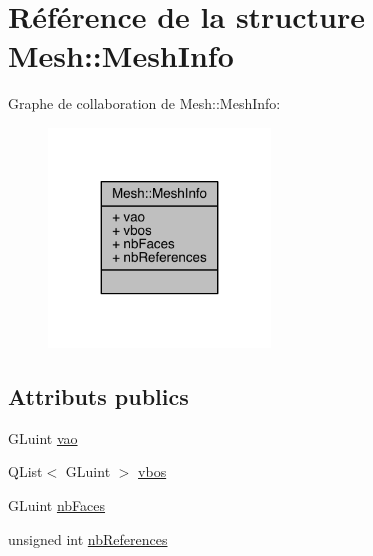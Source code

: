 \hypertarget{struct_mesh_1_1_mesh_info}{\section{Référence de la structure Mesh\+:\+:Mesh\+Info}
\label{struct_mesh_1_1_mesh_info}
}


Graphe de collaboration de Mesh\+:\+:Mesh\+Info\+:
\nopagebreak
\begin{figure}[H]
\begin{center}
\leavevmode
\includegraphics[width=167pt]{struct_mesh_1_1_mesh_info__coll__graph}
\end{center}
\end{figure}
\subsection*{Attributs publics}
\begin{DoxyCompactItemize}
\item 
G\+Luint \hyperlink{struct_mesh_1_1_mesh_info_af15096e0f0aa61fff7d8a1c223e547cf}{vao}
\item 
Q\+List$<$ G\+Luint $>$ \hyperlink{struct_mesh_1_1_mesh_info_ad360b326ff7424dc9b6a3f6614af895d}{vbos}
\item 
G\+Luint \hyperlink{struct_mesh_1_1_mesh_info_a6c5d4c62798c18f998550cc288f9ca91}{nb\+Faces}
\item 
unsigned int \hyperlink{struct_mesh_1_1_mesh_info_a8e32fc200e5ed8af32c409cac7b17342}{nb\+References}
\end{DoxyCompactItemize}


